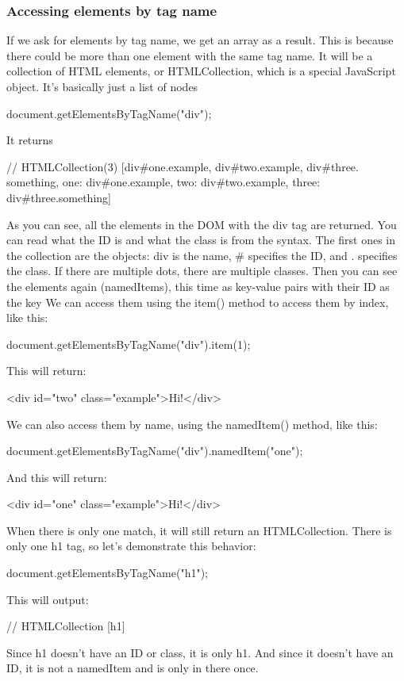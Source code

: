 \documentclass{report}
\begin{document}
\begin{jscode}
\subsubsection{Accessing elements by tag name}
\bigbreak \noindent 
If we ask for elements by tag name, we get an array as a result. This is because there
could be more than one element with the same tag name. It will be a collection of
HTML elements, or HTMLCollection, which is a special JavaScript object. It's basically
just a list of nodes
\bigbreak \noindent 
\begin{jscode}
document.getElementsByTagName("div");
\end{jscode}
\bigbreak \noindent 
It returns
\bigbreak \noindent 
\begin{jscode}
// HTMLCollection(3) [div#one.example, div#two.example, div#three. something, one: div#one.example, two: div#two.example, three: div#three.something]
\end{jscode}
\bigbreak \noindent 
As you can see, all the elements in the DOM with the div tag are returned. You
can read what the ID is and what the class is from the syntax. The first ones in the
collection are the objects: div is the name, # specifies the ID, and . specifies the class.
If there are multiple dots, there are multiple classes. Then you can see the elements
again (namedItems), this time as key-value pairs with their ID as the key
\bigbreak \noindent 
We can access them using the item() method to access them by index, like this:
\bigbreak \noindent 
\begin{jscode}
document.getElementsByTagName("div").item(1);
\end{jscode}
\bigbreak \noindent 
This will return:
\bigbreak \noindent 
\begin{jscode}
<div id="two" class="example">Hi!</div>
\end{jscode}
\bigbreak \noindent 
We can also access them by name, using the namedItem() method, like this:
\bigbreak \noindent 
\begin{jscode}
document.getElementsByTagName("div").namedItem("one");
\end{jscode}
\bigbreak \noindent 
And this will return:
\bigbreak \noindent 
\begin{jscode}
<div id="one" class="example">Hi!</div>
\end{jscode}
\bigbreak \noindent 
When there is only one match, it will still return an HTMLCollection. There is only
one h1 tag, so let's demonstrate this behavior:
\bigbreak \noindent 
\begin{jscode}
document.getElementsByTagName("h1");
\end{jscode}
\bigbreak \noindent 
This will output:
\bigbreak \noindent 
\begin{jscode}
// HTMLCollection [h1]
\end{jscode}
\bigbreak \noindent 
Since h1 doesn't have an ID or class, it is only h1. And since it doesn't have an ID, it
is not a namedItem and is only in there once.


\end{jscode}
\end{document}
